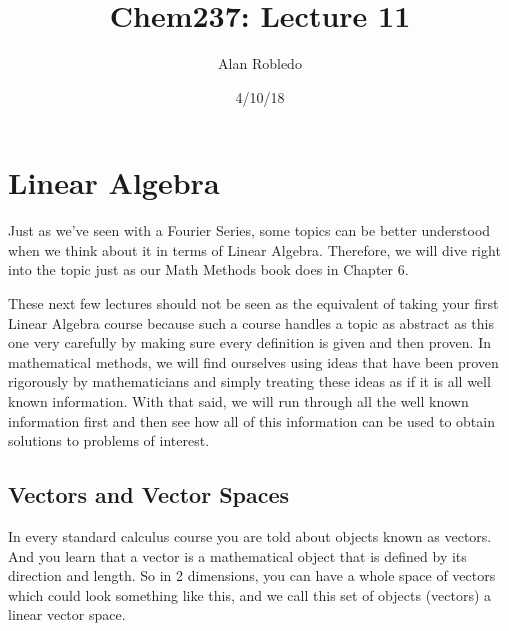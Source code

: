 \documentclass{article}
\title{Chem237: Lecture 11}
\date{4/10/18}
\author{Alan Robledo}
\begin{document}
\maketitle
\section*{Linear Algebra}
Just as we've seen with a Fourier Series, some topics can be better understood when we think about it in terms of Linear Algebra.
Therefore, we will dive right into the topic just as our Math Methods book does in Chapter 6.

These next few lectures should not be seen as the equivalent of taking your first Linear Algebra course because such a course handles a topic as abstract as this one very carefully by making sure every definition is given and then proven.
In mathematical methods, we will find ourselves using ideas that have been proven rigorously by mathematicians and simply treating these ideas as if it is all well known information.
With that said, we will run through all the well known information first and then see how all of this information can be used to obtain solutions to problems of interest.

\subsection*{Vectors and Vector Spaces}
In every standard calculus course you are told about objects known as vectors.
And you learn that a vector is a mathematical object that is defined by its direction and length.
So in 2 dimensions, you can have a whole space of vectors which could look something like this,
and we call this set of objects (vectors) a linear vector space.
\end{document}
